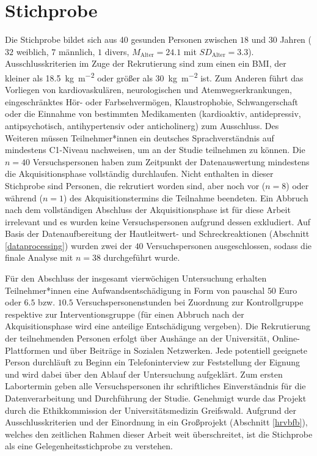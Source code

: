 

	\section{Stichprobe}\label{stichprobe}
			Die Stichprobe bildet sich aus 40 gesunden Personen zwischen $18$ und $30$ Jahren ($32$ weiblich, $7$ männlich, $1$ divers, $M_{\textrm{Alter}}=24.1$ mit $SD_{\textrm{Alter}}=3.3$).
			Ausschlusskriterien im Zuge der Rekrutierung sind zum einen ein BMI, der kleiner als \SI[per-mode=symbol]{18.5}{\kilogram\per\square\meter} oder größer als \SI[per-mode=symbol]{30}{\kilogram\per\square\meter} ist. Zum Anderen führt das Vorliegen von kardiovaskulären, neurologischen und Atemwegserkrankungen, eingeschränktes Hör- oder Farbsehvermögen, Klaustrophobie, Schwangerschaft oder die Einnahme von bestimmten Medikamenten (kardioaktiv, antidepressiv, antipsychotisch, antihypertensiv oder anticholinerg) zum Ausschluss. Des Weiteren müssen Teilnehmer*innen ein deutsches Sprachverständnis auf mindestens C1-Niveau nachweisen, um an der Studie teilnehmen zu können. 
			Die $n=40$ Versuchspersonen haben zum Zeitpunkt der Datenauswertung mindestens die Akquisitionsphase vollständig durchlaufen. Nicht enthalten in dieser Stichprobe sind Personen, die rekrutiert worden sind, aber noch vor ($n=8$) oder während ($n=1$) %
			des Akquisitionstermins die Teilnahme beendeten. Ein Abbruch nach dem vollständigen Abschluss der Akquisitionsphase ist für diese Arbeit irrelevant und es wurden keine Versuchspersonen aufgrund dessen exkludiert.
			Auf Basis der Datenaufbereitung der Hautleitwert- und Schreckreaktionen (Abschnitt \ref{dataprocessing}) wurden zwei der $40$ Versuchspersonen ausgeschlossen, sodass die finale Analyse mit $n=38$ durchgeführt wurde.
			
			Für den Abschluss der insgesamt vierwöchigen Untersuchung erhalten Teilnehmer*innen eine Aufwandsentschädigung in Form von pauschal $50$ Euro oder $6.5$ bzw. $10.5$ Versuchspersonenstunden bei Zuordnung zur Kontrollgruppe respektive zur Interventionsgruppe (für einen Abbruch nach der Akquisitionsphase wird eine anteilige Entschädigung vergeben).
			Die Rekrutierung der teilnehmenden Personen erfolgt über Aushänge an der Universität, Online-Plattformen und über Beiträge in Sozialen Netzwerken. Jede potentiell geeignete Person durchläuft zu Beginn ein Telefoninterview zur Feststellung der Eignung und wird dabei über den Ablauf der Untersuchung aufgeklärt. Zum ersten Labortermin geben alle Versuchspersonen ihr schriftliches Einverständnis für die Datenverarbeitung und Durchführung der Studie.
			Genehmigt wurde das Projekt durch die Ethikkommission der Universitätsmedizin Greifswald.
			Aufgrund der Ausschlusskriterien und der Einordnung in ein Großprojekt (Abschnitt \ref{hrvbfb}), welches den zeitlichen Rahmen dieser Arbeit weit überschreitet, ist die Stichprobe als eine Gelegenheitsstichprobe zu verstehen.
			

